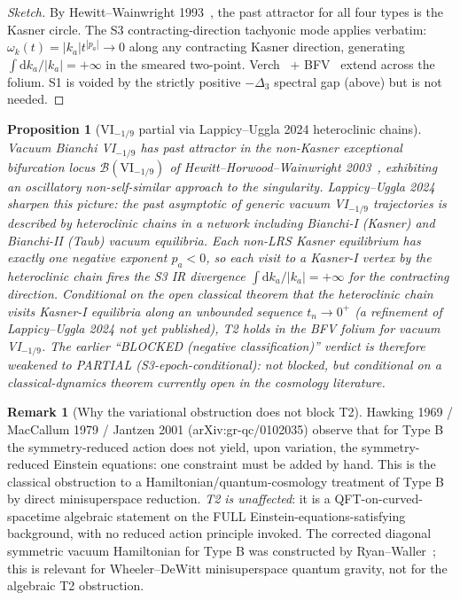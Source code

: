 \documentclass[11pt]{article}
\newtheorem{proposition}[theorem]{Proposition}
\theoremstyle{definition}
\newtheorem{remark}[theorem]{Remark}
\begin{document}
\begin{proof}[Sketch]
By Hewitt--Wainwright 1993~\cite{HewittWainwright1993}, the past attractor for all four types is the Kasner circle. The S3 contracting-direction tachyonic mode applies verbatim: $\omega_k(t)=|k_a|t^{|p_a|}\to 0$ along any contracting Kasner direction, generating $\int\mathrm{d}k_a/|k_a|=+\infty$ in the smeared two-point. Verch~\cite{Verch1994} + BFV~\cite{BrunettiFredenhagenVerch2003} extend across the folium. S1 is voided by the strictly positive $-\Delta_3$ spectral gap (above) but is not needed.
\end{proof}

\begin{proposition}[VI$_{-1/9}$ partial via Lappicy--Uggla 2024 heteroclinic chains]\label{prop:T2-VI19blocked}
Vacuum Bianchi VI$_{-1/9}$ has past attractor in the non-Kasner exceptional bifurcation locus $\mathcal B(\mathrm{VI}_{-1/9})$ of Hewitt--Horwood--Wainwright 2003~\cite{HewittHorwoodWainwright2003}, exhibiting an oscillatory non-self-similar approach to the singularity. Lappicy--Uggla 2024~\cite{LappicyUggla2024} sharpen this picture: the past asymptotic of generic vacuum VI$_{-1/9}$ trajectories is described by \emph{heteroclinic chains in a network including Bianchi-I (Kasner) and Bianchi-II (Taub) vacuum equilibria}. Each non-LRS Kasner equilibrium has exactly one negative exponent $p_a<0$, so each visit to a Kasner-I vertex by the heteroclinic chain fires the S3 IR divergence $\int\mathrm{d}k_a/|k_a|=+\infty$ for the contracting direction. Conditional on the open classical theorem that the heteroclinic chain visits Kasner-I equilibria along an unbounded sequence $t_n\to 0^+$ (a refinement of Lappicy--Uggla 2024 not yet published), T2 holds in the BFV folium for vacuum VI$_{-1/9}$. The earlier ``BLOCKED (negative classification)'' verdict is therefore weakened to \emph{PARTIAL (S3-epoch-conditional)}: not blocked, but conditional on a classical-dynamics theorem currently open in the cosmology literature.
\end{proposition}

\begin{remark}[Why the variational obstruction does not block T2]\label{rem:MacCallumJantzen}
Hawking 1969 / MacCallum 1979 / Jantzen 2001 (arXiv:gr-qc/0102035) observe that for Type B the symmetry-reduced action does not yield, upon variation, the symmetry-reduced Einstein equations: one constraint must be added by hand. This is the classical obstruction to a Hamiltonian/quantum-cosmology treatment of Type B by direct minisuperspace reduction. \emph{T2 is unaffected}: it is a QFT-on-curved-spacetime algebraic statement on the FULL Einstein-equations-satisfying background, with no reduced action principle invoked. The corrected diagonal symmetric vacuum Hamiltonian for Type B was constructed by Ryan--Waller~\cite{RyanWaller1997}; this is relevant for Wheeler--DeWitt minisuperspace quantum gravity, not for the algebraic T2 obstruction.
\end{remark}
\end{document}
